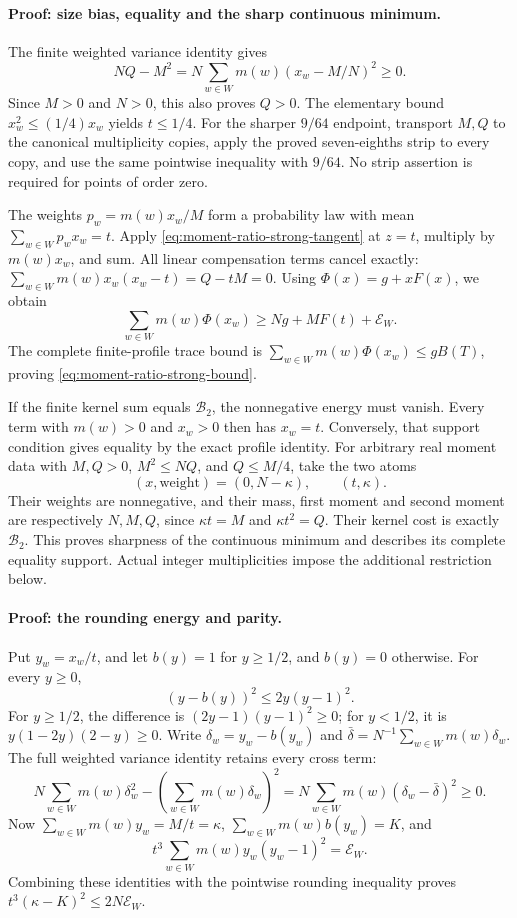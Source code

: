 \paragraph{Proof: size bias, equality and the sharp continuous minimum.}
The finite weighted variance identity gives
\[
 NQ-M^2=N\sum_{w\in W}m(w)(x_w-M/N)^2\ge0.
\]
Since \(M>0\) and \(N>0\), this also proves \(Q>0\).
The elementary bound \(x_w^2\le(1/4)x_w\) yields \(t\le1/4\).
For the sharper \(9/64\) endpoint, transport \(M,Q\) to the canonical
multiplicity copies, apply the proved seven-eighths strip to every copy,
and use the same pointwise inequality with \(9/64\).
No strip assertion is required for points of order zero.

The weights \(p_w=m(w)x_w/M\) form a probability law with mean
\(\sum_{w\in W}p_wx_w=t\).
Apply \eqref{eq:moment-ratio-strong-tangent} at \(z=t\), multiply by
\(m(w)x_w\), and sum.  All linear compensation terms cancel exactly:
\(\sum_{w\in W}m(w)x_w(x_w-t)=Q-tM=0\).
Using \(\Phi(x)=g+xF(x)\), we obtain
\[
 \sum_{w\in W}m(w)\Phi(x_w)
 \ge Ng+MF(t)+\mathcal E_W.
\]
The complete finite-profile trace bound is
\(\sum_{w\in W}m(w)\Phi(x_w)\le gB(T)\), proving
\eqref{eq:moment-ratio-strong-bound}.

If the finite kernel sum equals \(\mathcal B_2\), the nonnegative
energy must vanish.  Every term with \(m(w)>0\) and \(x_w>0\)
then has \(x_w=t\).  Conversely, that support condition gives equality
by the exact profile identity.  For arbitrary real moment data with
\(M,Q>0\), \(M^2\le NQ\), and \(Q\le M/4\), take the two atoms
\[
 (x,\text{weight})=(0,N-\kappa),\qquad(t,\kappa).
\]
Their weights are nonnegative, and their mass, first moment and second
moment are respectively \(N,M,Q\), since
\(\kappa t=M\) and \(\kappa t^2=Q\).
Their kernel cost is exactly \(\mathcal B_2\).  This proves sharpness
of the continuous minimum and describes its complete equality support.
Actual integer multiplicities impose the additional restriction below.

\paragraph{Proof: the rounding energy and parity.}
Put \(y_w=x_w/t\), and let \(b(y)=1\) for \(y\ge1/2\), and
\(b(y)=0\) otherwise.  For every \(y\ge0\),
\[
 (y-b(y))^2\le2y(y-1)^2.
\]
For \(y\ge1/2\), the difference is
\((2y-1)(y-1)^2\ge0\); for \(y<1/2\), it is
\(y(1-2y)(2-y)\ge0\).
Write \(\delta_w=y_w-b(y_w)\) and
\(\bar\delta=N^{-1}\sum_{w\in W}m(w)\delta_w\).
The full weighted variance identity retains every cross term:
\[
 N\sum_{w\in W}m(w)\delta_w^2
 -\left(\sum_{w\in W}m(w)\delta_w\right)^2
 =N\sum_{w\in W}m(w)(\delta_w-\bar\delta)^2\ge0.
\]
Now \(\sum_{w\in W}m(w)y_w=M/t=\kappa\),
\(\sum_{w\in W}m(w)b(y_w)=K\), and
\[
 t^3\sum_{w\in W}m(w)y_w(y_w-1)^2=\mathcal E_W.
\]
Combining these identities with the pointwise rounding inequality proves
\(t^3(\kappa-K)^2\le2N\mathcal E_W\).

